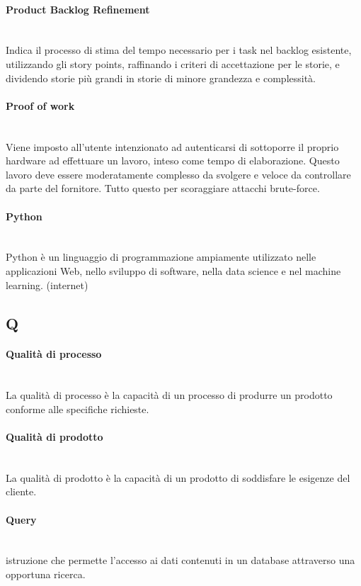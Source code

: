 \paragraph{Product Backlog Refinement}~\smallskip \\
Indica il processo di stima del tempo necessario per i task nel backlog esistente, utilizzando gli story points, 
raffinando i criteri di accettazione per le storie, e dividendo storie più grandi in storie di minore grandezza e complessità.

\paragraph{Proof of work}~\smallskip \\
Viene imposto all'utente intenzionato ad autenticarsi di sottoporre il proprio hardware ad effettuare un lavoro, inteso come tempo di elaborazione. Questo lavoro deve essere moderatamente complesso da svolgere e veloce da controllare da parte del fornitore. Tutto questo per scoraggiare attacchi brute-force.

\paragraph{Python}~\smallskip \\
Python è un linguaggio di programmazione ampiamente utilizzato nelle applicazioni Web, nello sviluppo di software, nella data science e nel machine learning. (internet)
\newpage
{}
\subsection*{Q}
\paragraph{Qualità di processo}~\smallskip \\
La qualità di processo è la capacità di un processo di produrre un prodotto conforme alle specifiche richieste.

\paragraph{Qualità di prodotto}~\smallskip \\
La qualità di prodotto è la capacità di un prodotto di soddisfare le esigenze del cliente.
\paragraph{Query}~\smallskip \\
istruzione che permette l'accesso ai dati contenuti in un database attraverso una opportuna ricerca.

